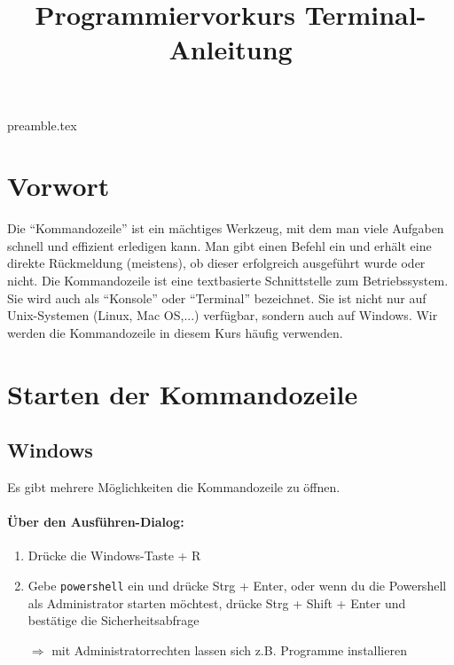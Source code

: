 \RequirePackage{import}
{preamble.tex}
\usepackage{hyperref}

\title{Programmiervorkurs Terminal-Anleitung}


\maketitle

\section{Vorwort}
Die \enquote{Kommandozeile} ist ein mächtiges Werkzeug, mit dem man viele Aufgaben schnell und effizient erledigen kann. Man gibt einen Be\-fehl ein und erhält eine direkte Rückmeldung (meistens), ob dieser erfolgreich ausgeführt wurde oder nicht. Die Kommandozeile ist eine textbasierte Schnittstelle zum Betriebssystem. Sie wird auch als \enquote{Konsole} oder \enquote{Terminal} bezeichnet. Sie ist nicht nur auf Unix-Systemen (Linux, Mac OS,...) verfügbar, sondern auch auf Windows. Wir werden die Kommandozeile in diesem Kurs häufig verwenden.

\section{Starten der Kommandozeile}

\subsection{Windows}
Es gibt mehrere Möglichkeiten die Kommandozeile zu öffnen.
\paragraph{Über den Ausführen-Dialog:}\mbox{}
\begin{enumerate}
    \item Drücke die Windows-Taste + R
    \item Gebe \texttt{powershell} ein und drücke Strg + Enter, oder wenn du die Powershell als Administrator starten möchtest, drücke Strg + Shift + Enter und bestätige die Sicherheitsabfrage
    \item[$\Rightarrow$] mit Administratorrechten lassen sich z.B. Programme installieren
\end{enumerate}

